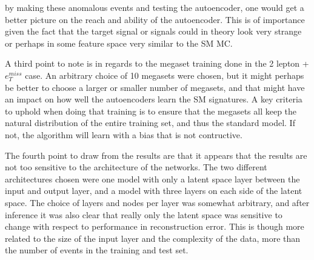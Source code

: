 by making these anomalous events and testing the autoencoder, one would get a better 
picture on the reach and ability of the autoencoder. This is of importance given the 
fact that the target signal or signals could in theory look very strange or perhaps 
in some feature space very similar to the SM MC. \par 
A third point to note is in regards to the megaset training done in the 2 lepton + 
$e_T^{miss}$ case. An arbitrary choice of 10 megasets were chosen, but it might perhaps 
be better to choose a larger or smaller number of megasets, and that might have an impact
on how well the autoencoders learn the SM signatures. A key criteria to uphold when 
doing that training is to ensure that the megasets all keep the natural distribution of 
the entire training set, and thus the standard model. If not, the algorithm will learn
with a bias that is not contructive. \par 
The fourth point to draw from the results are that it appears that the results are not 
too sensitive to the architecture of the networks. The two different architectures chosen
were one model with only a latent space layer between the input and output layer, and a model
with three layers on each side of the latent space. The choice of layers and nodes per layer 
was somewhat arbitrary, and after inference it was also clear that really only the latent space
was sensitive to change with respect to performance in reconstruction error. This is though 
more related to the size of the input layer and the complexity of the data, more than 
the number of events in the training and test set. 